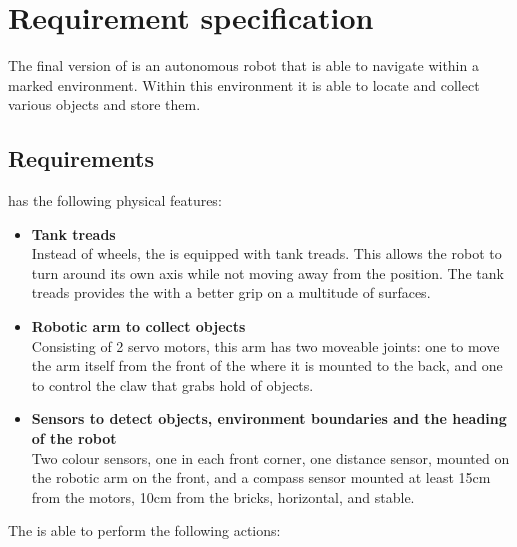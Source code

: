 \section{Requirement specification} \label{sec:requirement_specification}

The final version of \projname{} is an autonomous robot that is able to navigate within a marked environment. Within this environment it is able to locate and collect various objects and store them.

\subsection{Requirements}

\projname{} has the following physical features:

\begin{itemize}
    \item \textbf{Tank treads}\\
        Instead of wheels, the \projname{} is equipped with tank treads. This allows the robot to turn around its own axis while not moving away from the position. The tank treads provides the \projname{} with a better grip on a multitude of surfaces.
    \item \textbf{Robotic arm to collect objects}\\
        Consisting of 2 servo motors, this arm has two moveable joints: one to move the arm itself from the front of the \projname{} where it is mounted to the back, and one to control the claw that grabs hold of objects.
    \item \textbf{Sensors to detect objects, environment boundaries and the heading of the robot}\\
        Two colour sensors, one in each front corner, one distance sensor, mounted on the robotic arm on the front, and a compass sensor mounted at least 15cm from the motors, 10cm from the bricks, horizontal, and stable.
    \end{itemize}
    
The \projname{} is able to perform the following actions:

